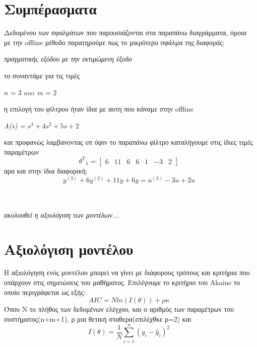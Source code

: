 \documentclass{article}
\begin{document}
 \section*{Συμπέρασματα}
 \Large{}
Δεδομένου των σφαλμάτων που παρουσιάζονται στα παραπάνω διαγράμματα, όμοια με την offline μέθοδο παρατηρούμε πως το μικρότερο σφάλμα της διαφοράς: \begin{center}
\textit{πραγματικής εξόδου με την εκτιμώμενη έξοδο}
\end{center}  το συναντάμε για τις τιμές\begin{center}
$\boxed{\textit{n = 3 και m = 2}}$
\end{center}
η επιλογή του φίλτρου ήταν ίδια με αυτη που κάναμε στην offline
\begin{center}
\textit{Λ(s) = $s^3+4s^2+5s+2$}
\end{center}
και προφανώς λαμβανοντας υπ όψιν το παραπάνω φίλτρο καταλήγουμε στις ίδιες τιμές παραμέτρων
\begin{equation*}
{θ^{Τ}}_λ = \begin{bmatrix}
6 &  11 & 6 & 6
     &  1 & -3 & 2   
\end{bmatrix}
\end{equation*}
αρα και στην ίδια διαφορική:
\begin{equation*}
y^{(3)} + 6y^{(2)} + 11\dot{y} + 6y = u^{(2)} -3\dot{u} + 2u
\end{equation*}
\\
\\
\begin{center}
\textit{ακολουθεί η αξιολόγιση των μοντέλων...}
\end{center}
 \large{}
\clearpage
\section*{Αξιολόγιση μοντέλου}
\Large
Η αξιολόγηση ενός μοντέλου μπορεί να γίνει με διάφορους τρόπους
και κριτήρια που υπάρχουν στις σημειώσεις του μαθήματος. Επιλέγουμε το κριτήριο του Akaine το οποίο περιγράφεται ως εξής:
\begin{equation*}
\boxed{AIC=Nln \left(I(θ) \right) + ρκ
}
\end{equation*}
Όπου Ν το πλήθος των δεδομένων ελέγχου, και ο αριθμός των παραμέτρων του συστήματος(n+m+1), ρ μια θετική σταθερα(επιλέχθκε ρ=2) και
\begin{equation*}
I(θ)=\frac{1}{N} \sum_{i=1}^{n} \left(y_i-\hat{y}_i \right)^{2}
\end{equation*}
\end{document}
